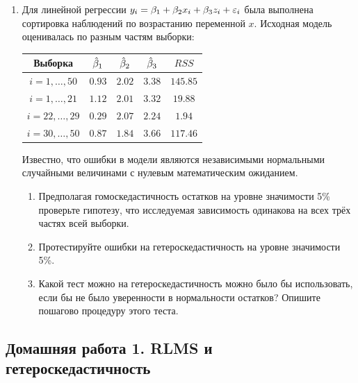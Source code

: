 \documentclass[12pt, a4paper]{article}
\begin{document}
\begin{enumerate}
\item Для линейной регрессии $y_i = \beta_1 + \beta_2 x_i + \beta_3 z_i + \varepsilon_i$ была выполнена сортировка наблюдений по возрастанию переменной $x$. Исходная модель оценивалась по разным частям выборки:

\begin{tabular}{c|cccc}
Выборка & $\hat{\beta}_1$ & $\hat{\beta}_2$ & $\hat{\beta}_3$ & $RSS$ \\

\hline
$i=1,\ldots, 50$ & $0.93$ & $2.02$ & $3.38$ & $145.85$ \\
$i=1,\ldots, 21$ & $1.12$ & $2.01$ & $3.32$ & $19.88$ \\
$i=22,\ldots, 29$ & $0.29$ & $2.07$ & $2.24$ & $1.94$ \\
$i=30,\ldots, 50$ & $0.87$ & $1.84$ & $3.66$ & $117.46$ \\
\end{tabular}

Известно, что ошибки в модели являются независимыми нормальными случайными величинами с нулевым математическим ожиданием.

\begin{enumerate}
\item Предполагая гомоскедастичность остатков на уровне значимости 5\% проверьте гипотезу, что исследуемая зависимость одинакова на всех трёх частях всей выборки.
\item Протестируйте ошибки на гетероскедастичность на уровне значимости 5\%.
\item Какой тест можно на гетероскедастичность можно было бы использовать, если бы не было уверенности в нормальности остатков? Опишите пошагово процедуру этого теста.
\end{enumerate}

\end{enumerate}


\subsection{Домашняя работа 1. RLMS и гетероскедастичность}
\end{document}
